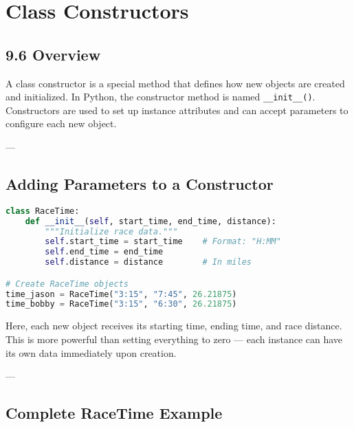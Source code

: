 \chapter{Class Constructors}
\label{ch:class_constructors}

\section*{9.6 Overview}
A class constructor is a special method that defines how new objects are created and initialized.
In Python, the constructor method is named \texttt{\_\_init\_\_()}.
Constructors are used to set up instance attributes and can accept parameters to configure each new object.

---

\section*{Adding Parameters to a Constructor}

\begin{lstlisting}[language=Python, caption={A simple constructor with parameters.}]
class RaceTime:
    def __init__(self, start_time, end_time, distance):
        """Initialize race data."""
        self.start_time = start_time    # Format: "H:MM"
        self.end_time = end_time
        self.distance = distance        # In miles

# Create RaceTime objects
time_jason = RaceTime("3:15", "7:45", 26.21875)
time_bobby = RaceTime("3:15", "6:30", 26.21875)
\end{lstlisting}

Here, each new object receives its starting time, ending time, and race distance.
This is more powerful than setting everything to zero — each instance can have its own data immediately upon creation.

---

\section*{Complete RaceTime Example}

